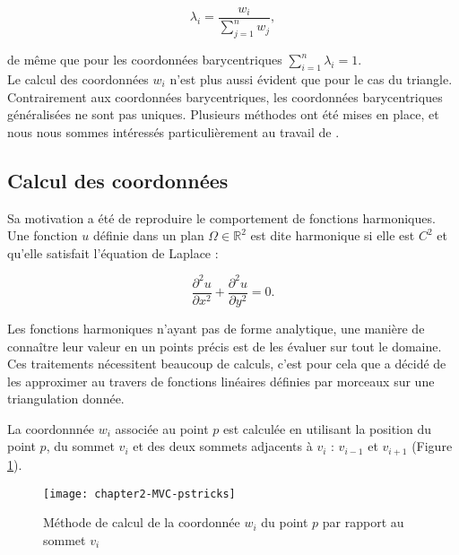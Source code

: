 \begin{equation}
  \lambda_i = \frac{w_i}{\sum_{j=1}^n w_j},
\end{equation}

de même que pour les coordonnées barycentriques $\sum_{i=1}^n \lambda_i = 1$.
\\

Le calcul des coordonnées $w_i$ n'est plus aussi évident que pour le cas du
triangle. Contrairement aux coordonnées barycentriques, les coordonnées
barycentriques généralisées ne sont pas uniques. Plusieurs méthodes ont été
mises en place, et nous nous sommes intéressés particulièrement au travail de
\cite{Flo03}.

\subsection{Calcul des coordonnées}

Sa motivation a été de reproduire le comportement de fonctions harmoniques.
Une fonction $u$ définie dans un plan $\Omega \in \mathbb{R}^2$ est dite
harmonique si elle est $C^2$ et qu'elle satisfait l'équation de Laplace :

\begin{equation}
  \frac{\partial^2 u}{\partial x^2} + \frac{\partial^2 u}{\partial y^2} = 0.
\end{equation}

Les fonctions harmoniques n'ayant pas de forme analytique, une manière de
connaître leur valeur en un points précis est de les évaluer sur tout le
domaine. Ces traitements nécessitent beaucoup de calculs, c'est pour cela que
\cite{Flo03} a décidé de les approximer au travers de fonctions linéaires
définies par morceaux sur une triangulation donnée.

La coordonnnée $w_i$ associée au point $p$ est calculée en utilisant la
position du point $p$, du sommet $v_i$ et des deux sommets adjacents à $v_i$ :
$v_{i-1}$ et $v_{i+1}$ (Figure \ref{DEFcal}).

\begin{figure}[ht]
  \begin{center}
    \texttt{[image: chapter2-MVC-pstricks]}

    \caption[Méthode de calcul MVC] {Méthode de calcul de la coordonnée $w_i$
du point $p$ par rapport au sommet $v_i$}

    \label{DEFcal}   \end{center} \end{figure}

